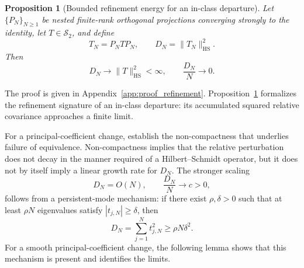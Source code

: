 \documentclass[11pt]{article}
\newtheorem{proposition}{Proposition}[section]
\numberwithin{table}{section}
\numberwithin{figure}{section}
\begin{document}
\begin{proposition}[Bounded refinement energy for an in-class departure]
\label{prop:refinement}
Let $\{P_N\}_{N\ge1}$ be nested finite-rank orthogonal projections converging strongly to the identity, let $T\in\mathcal S_2$, and define
\begin{equation}
    T_N=P_NTP_N,
    \qquad
    D_N=\|T_N\|_{\mathrm{HS}}^2.
\end{equation}
Then
\begin{equation}
    D_N
    \longrightarrow
    \|T\|_{\mathrm{HS}}^2
    <\infty,
    \qquad
    \frac{D_N}{N}\longrightarrow0.
    \label{eq:prop_hs}
\end{equation}
\end{proposition}

The proof is given in Appendix~\ref{app:proof_refinement}. Proposition~\ref{prop:refinement} formalizes the refinement signature of an in-class departure: its accumulated squared relative covariance approaches a finite limit.

For a principal-coefficient change, \citet[Lemma~4.9]{BolinKirchner2023} establish the non-compactness that underlies failure of equivalence. Non-compactness implies that the relative perturbation does not decay in the manner required of a Hilbert--Schmidt operator, but it does not by itself imply a linear growth rate for $D_N$. The stronger scaling
\begin{equation}
    D_N=O(N),
    \qquad
    \frac{D_N}{N}\longrightarrow c>0,
    \label{eq:extensive_scaling}
\end{equation}
follows from a persistent-mode mechanism: if there exist $\rho,\delta>0$ such that at least $\rho N$ eigenvalues satisfy $|t_{j,N}|\ge\delta$, then
\begin{equation}
    D_N
    =
    \sum_{j=1}^{N}t_{j,N}^2
    \ge
    \rho N\delta^2.
    \label{eq:persistent_mode_bound}
\end{equation}
For a smooth principal-coefficient change, the following lemma shows that this mechanism is present and identifies the limits.
\end{document}
